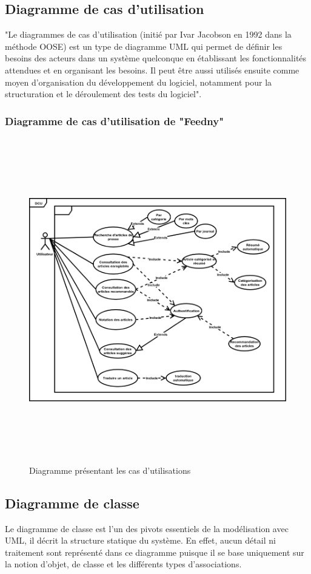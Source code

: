 \subsection{Diagramme de cas d'utilisation}
"Le diagrammes de cas d'utilisation (initié par Ivar Jacobson en 1992 dans la méthode OOSE) est un type de diagramme UML qui permet de définir les besoins des acteurs dans un système quelconque en établissant les fonctionnalités attendues et en organisant les besoins. Il peut être aussi utilisés ensuite comme moyen d'organisation du développement du logiciel, notamment pour la structuration et le déroulement des tests du logiciel".\cite{UML}

\subsubsection{Diagramme de cas d'utilisation de "Feedny"}
\begin{figure}[H]
    \centering
    \includegraphics[height=400pt,width=350pt]{img/chapter3/diagcasdutilisation.png}
    \caption{Diagramme présentant les cas d'utilisations}
\end{figure}

\subsection{Diagramme de classe}
Le diagramme de classe est l'un des pivots essentiels de la modélisation avec UML, il décrit la structure statique du système. En effet, aucun détail ni traitement sont représenté dans ce diagramme puisque il 
se base uniquement sur la notion d'objet, de classe et les différents types d'associations.\cite{UML}

